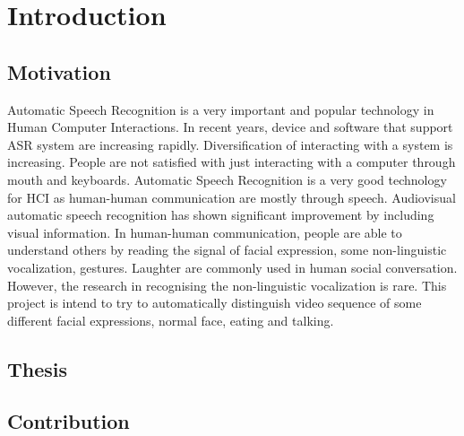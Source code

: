 \chapter{Introduction}
\section{Motivation}
Automatic Speech Recognition is a very important and popular technology in Human Computer Interactions. In recent years, device and software that support ASR system are increasing rapidly. Diversification of interacting with a system is increasing. People are not satisfied with just interacting with a computer through mouth and keyboards. Automatic Speech Recognition is a very good technology for HCI as human-human communication are mostly through speech. Audiovisual automatic speech recognition has shown significant improvement by including visual information. In human-human communication, people are able to understand others by reading the signal of facial expression, some non-linguistic vocalization, gestures. \cite{petridis2011prediction} Laughter are commonly used in human social conversation. However, the research in recognising the non-linguistic vocalization is rare. This project is intend to try to automatically distinguish video sequence of some different facial expressions, normal face, eating and talking.
\section{Thesis}

\section{Contribution}